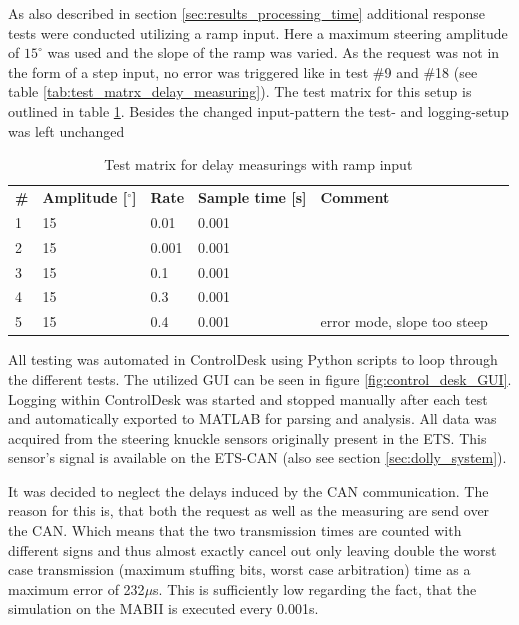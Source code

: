 \documentclass[ExampleMasters.tex]{subfiles}
\begin{document}


As also described in section \ref{sec:results_processing_time} additional response tests were conducted utilizing a ramp input. Here a maximum steering amplitude of $15^\circ $ was used and the slope of the ramp was varied. As the request was not in the form of a step input, no error was triggered like in test \#9 and \#18 (see table \ref{tab:test_matrx_delay_measuring}). The test matrix for this setup is outlined in table \ref{tab:test_matrx_ramp_input}. Besides the changed input-pattern the test- and logging-setup was left unchanged

\begin{table}[h]
	
	\centering
\begin{tabular}{llllll}

 \textbf{\#} &\textbf{ Amplitude [$^\circ$]} & \textbf{Rate} & \textbf{Sample time [s]} & \textbf{Comment} &  \\ 
1	  &  15 & 0.01 & 0.001 &   \\ 
2	  & 15 & 0.001 &  0.001&  \\ 
3	  & 15 & 0.1 &  0.001&   \\ 
4	  & 15 & 0.3 & 	 0.001&   \\ 
5	  & 15 & 0.4 & 0.001 &  error mode, slope too steep\\ 

\end{tabular} 
\caption{Test matrix for delay measurings with ramp input}
\label{tab:test_matrx_ramp_input}	
\end{table}


All testing was automated in ControlDesk using Python scripts to loop through the different tests. The utilized \gls{GUI} can be seen in figure \ref{fig:control_desk_GUI}. Logging within ControlDesk was started and stopped manually after each test and automatically exported to MATLAB for parsing and analysis. All data was acquired from the steering knuckle sensors originally present in the \gls{ETS}. This sensor's signal is available on the \gls{ETS}-\gls{CAN} (also see section \ref{sec:dolly_system}). 

It was decided to neglect the delays induced by the \gls{CAN} communication. The reason for this is, that both the request as well as the measuring are send over the \gls{CAN}. Which means that the two transmission times are counted with different signs and thus almost exactly cancel out only leaving double the worst case transmission (maximum stuffing bits, worst case arbitration) time as a maximum error of 232$\mu$s. This is sufficiently low regarding the fact, that the simulation on the \gls{MABII} is executed every 0.001s.     
\end{document}
